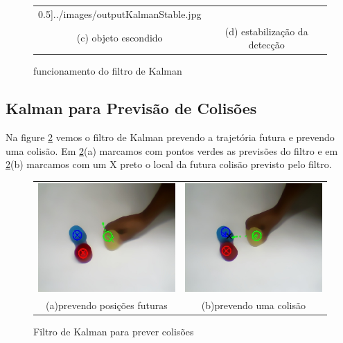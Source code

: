 \documentclass[journal]{IEEEtran}
\begin{document}
\begin{figure}[!htp]
\begin{tabular}{cc}
		  0.5]{../images/outputKalmanStable.jpg}\\	
	{\scriptsize(c) objeto escondido}& {\scriptsize(d) 
estabilização da detecção}\\ 
  \end{tabular}  
  \caption{funcionamento do filtro de Kalman}
  \label{fig:KalmanPast}
  \end{figure}

  \subsection{Kalman para Previsão de Colisões}

  Na figure \ref{fig:KalmanFuture} vemos o filtro de Kalman prevendo
  a trajetória futura e prevendo uma colisão. Em 
\ref{fig:KalmanFuture}(a) marcamos com pontos verdes as previsões do 
filtro e em \ref{fig:KalmanFuture}(b) marcamos com um X preto o local
da futura colisão previsto pelo filtro.
  \begin{figure}[!htp]
  \centering
  \begin{tabular}{cc}
	\includegraphics[scale = 0.5]{../images/outputFuture.jpg}& 
	\includegraphics[scale = 0.5]{../images/outputColision.jpg} \\
	{\scriptsize(a)prevendo posições futuras} & 
{\scriptsize(b)prevendo uma colisão} \\
  \end{tabular}  
  \caption{Filtro de Kalman para prever colisões}
  \label{fig:KalmanFuture}
  \end{figure}
\end{document}

